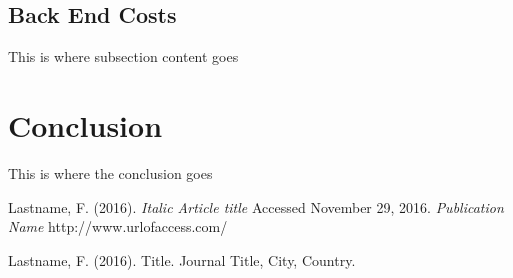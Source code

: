 \documentclass{roffin}
\begin{document}
\subsection{Back End Costs}
This is where subsection content goes

\section{Conclusion}
This is where the conclusion goes

\vfill

\begin{thebibliography}{}

Lastname, F. (2016). \textit{Italic Article title}
Accessed November 29, 2016. \textit{Publication Name} http://www.urlofaccess.com/



Lastname, F. (2016).
Title.
Journal Title, City, Country.


\end{thebibliography}
\end{document}
